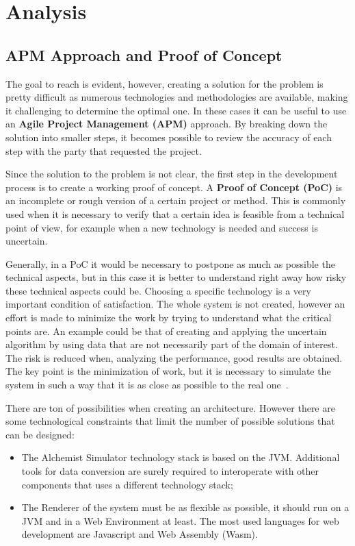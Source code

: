 \chapter{Analysis}
\label{chap:analysis}
\section{APM Approach and Proof of Concept}
\label{sec:apm-approach-and-proof-of-concept}
The goal to reach is evident, however, creating a solution for the problem is pretty difficult as numerous technologies and methodologies are available, making it challenging to determine the optimal one. In these cases it can be useful to use an \textbf{Agile Project Management (APM)} approach. By breaking down the solution into smaller steps, it becomes possible to review the accuracy of each step with the party that requested the project.\newline

Since the solution to the problem is not clear, the first step in the development process is to create a working proof of concept. A \textbf{Proof of Concept (PoC)} is an incomplete or rough version of a certain project or method. This is commonly used when it is necessary to verify that a certain idea is feasible from a technical point of view, for example when a new technology is needed and success is uncertain.\newline

Generally, in a PoC it would be necessary to postpone as much as possible the technical aspects, but in this case it is better to understand right away how risky these technical aspects could be. Choosing a specific technology is a very important condition of satisfaction. The whole system is not created, however an effort is made to minimize the work by trying to understand what the critical points are. An example could be that of creating and applying the uncertain algorithm by using data that are not necessarily part of the domain of interest. The risk is reduced when, analyzing the performance, good results are obtained. The key point is the minimization of work, but it is necessary to simulate the system in such a way that it is as close as possible to the real one~\cite{slides-scoping}.\newline

There are ton of possibilities when creating an architecture. However there are some technological constraints that limit the number of possible solutions that can be designed:
\begin{itemize}
	\item The Alchemist Simulator technology stack is based on the JVM. Additional tools for data conversion are surely required to interoperate with other components that uses a different technology stack;
	\item The Renderer of the system must be as flexible as possible, it should run on a JVM and in a Web Environment at least. The most used languages for web development are Javascript and Web Assembly (Wasm).
\end{itemize}

